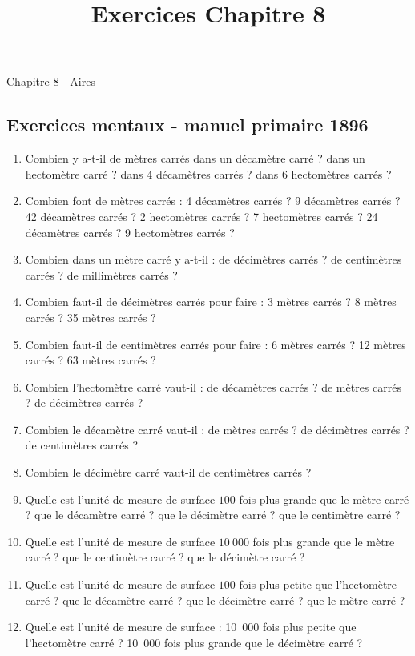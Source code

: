 \documentclass[12 pt]{extarticle}
\title{Exercices Chapitre 8}
\date{}
\theoremstyle{plain}
\begin{document}
\begin{center}{\Large Chapitre 8 - Aires}\\ 
 \end{center}
 
  \subsection*{Exercices mentaux - manuel primaire 1896}
  
\begin{enumerate}
\item Combien y a-t-il de mètres carrés dans un décamètre carré ? dans un hectomètre carré ? dans $4$ décamètres carrés ? dans $6$ hectomètres carrés ? 
\item Combien font de mètres carrés : 4 décamètres carrés ? 9 décamètres carrés ? 42 décamètres carrés ? 
2 hectomètres carrés ? 7 hectomètres carrés ? 24 décamètres carrés ? 9 hectomètres carrés ? 
\item Combien dans un mètre carré y a-t-il : de décimètres carrés ? de centimètres carrés ? de millimètres carrés ? 
\item Combien faut-il de décimètres carrés pour faire : 3 mètres carrés ? 8 mètres carrés ? 35 mètres carrés ? 
\item Combien faut-il de centimètres carrés pour faire : 6 mètres carrés ? 12 mètres carrés ? 63 mètres carrés ? 
\item Combien l'hectomètre carré vaut-il : de décamètres carrés ? de mètres carrés ? de décimètres carrés ? 
\item Combien le décamètre carré vaut-il : de mètres carrés ? de décimètres carrés ? de centimètres carrés ? 
\item Combien le décimètre carré vaut-il de centimètres carrés ?
\item Quelle est l'unité de mesure de surface $100$ fois plus grande que le mètre carré ? que le décamètre carré ? que le décimètre carré ? que le centimètre carré ?
\item Quelle est l'unité de mesure de surface
$10~000$ fois plus grande que le mètre carré ? que le centimètre carré ? que le décimètre carré ? 
\item Quelle est l'unité de mesure de surface $100$ fois plus petite que l'hectomètre carré ? que le décamètre carré ? que le décimètre carré ? que le mètre carré ? 
\item Quelle est l'unité de mesure de surface : 10~000 fois plus petite que l'hectomètre carré ? 10~000 fois plus grande que le décimètre carré ? 

\end{enumerate}
\end{document}
